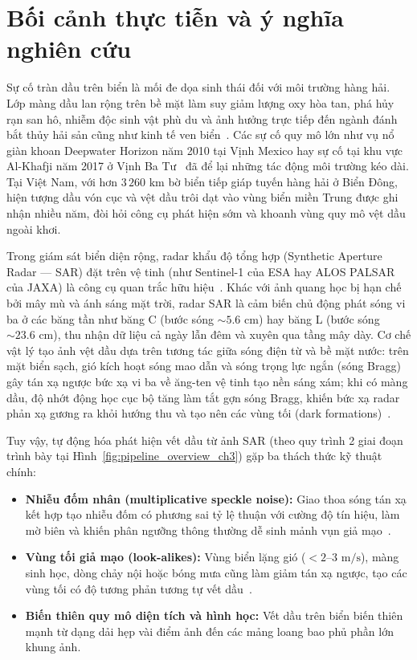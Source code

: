 \section{Bối cảnh thực tiễn và ý nghĩa nghiên cứu}
\label{sec:boi_canh}

Sự cố tràn dầu trên biển là mối đe dọa sinh thái đối với môi trường hàng hải. Lớp màng dầu lan rộng trên bề mặt làm suy giảm lượng oxy hòa tan, phá hủy rạn san hô, nhiễm độc sinh vật phù du và ảnh hưởng trực tiếp đến ngành đánh bắt thủy hải sản cũng như kinh tế ven biển~\cite{fingas2014review}. Các sự cố quy mô lớn như vụ nổ giàn khoan Deepwater Horizon năm 2010 tại Vịnh Mexico hay sự cố tại khu vực Al-Khafji năm 2017 ở Vịnh Ba Tư~\cite{zhu2022oil} đã để lại những tác động môi trường kéo dài. Tại Việt Nam, với hơn $3\,260\text{ km}$ bờ biển tiếp giáp tuyến hàng hải ở Biển Đông, hiện tượng dầu vón cục và vệt dầu trôi dạt vào vùng biển miền Trung được ghi nhận nhiều năm, đòi hỏi công cụ phát hiện sớm và khoanh vùng quy mô vệt dầu ngoài khơi.

Trong giám sát biển diện rộng, radar khẩu độ tổng hợp (Synthetic Aperture Radar --- SAR) đặt trên vệ tinh (như Sentinel-1 của ESA hay ALOS PALSAR của JAXA) là công cụ quan trắc hữu hiệu~\cite{brekke2005oil,topouzelis2008oil}. Khác với ảnh quang học bị hạn chế bởi mây mù và ánh sáng mặt trời, radar SAR là cảm biến chủ động phát sóng vi ba ở các băng tần như băng C (bước sóng $\sim 5.6\text{ cm}$) hay băng L (bước sóng $\sim 23.6\text{ cm}$), thu nhận dữ liệu cả ngày lẫn đêm và xuyên qua tầng mây dày. Cơ chế vật lý tạo ảnh vệt dầu dựa trên tương tác giữa sóng điện từ và bề mặt nước: trên mặt biển sạch, gió kích hoạt sóng mao dẫn và sóng trọng lực ngắn (sóng Bragg) gây tán xạ ngược bức xạ vi ba về ăng-ten vệ tinh tạo nền sáng xám; khi có màng dầu, độ nhớt động học cục bộ tăng làm tắt gợn sóng Bragg, khiến bức xạ radar phản xạ gương ra khỏi hướng thu và tạo nên các vùng tối (dark formations)~\cite{yang2025oil}.

Tuy vậy, tự động hóa phát hiện vết dầu từ ảnh SAR (theo quy trình 2 giai đoạn trình bày tại Hình~\ref{fig:pipeline_overview_ch3}) gặp ba thách thức kỹ thuật chính:
\begin{itemize}
    \item \textbf{Nhiễu đốm nhân (multiplicative speckle noise):} Giao thoa sóng tán xạ kết hợp tạo nhiễu đốm có phương sai tỷ lệ thuận với cường độ tín hiệu, làm mờ biên và khiến phân ngưỡng thông thường dễ sinh mảnh vụn giả mạo~\cite{lee1980digital}.
    \item \textbf{Vùng tối giả mạo (look-alikes):} Vùng biển lặng gió ($< 2\text{--}3\text{ m/s}$), màng sinh học, dòng chảy nội hoặc bóng mưa cũng làm giảm tán xạ ngược, tạo các vùng tối có độ tương phản tương tự vết dầu~\cite{solberg2007oil}.
    \item \textbf{Biến thiên quy mô diện tích và hình học:} Vết dầu trên biển biến thiên mạnh từ dạng dải hẹp vài điểm ảnh đến các mảng loang bao phủ phần lớn khung ảnh.
\end{itemize}
